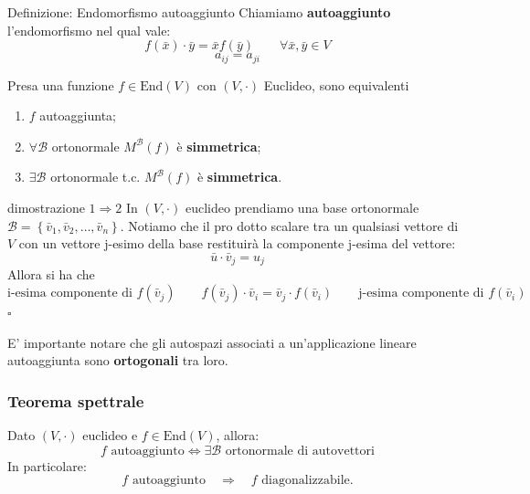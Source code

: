 \documentclass[x11names]{article}
\newcommand*{\QEDB}{\null\nobreak\hfill\ensuremath{\square}}%
\begin{document}
\begin{center}
\colorbox{myblue}{\begin{minipage}{5.75in}
\begin{blues}{Definizione: Endomorfismo autoaggiunto}
Chiamiamo \textbf{autoaggiunto} l'endomorfismo  nel qual vale:\[
f\left(\bar{x}\right)\cdot \bar{y} = \bar{x}f\left(\bar{y}\right) \qquad \forall\bar{x},\bar{y} \in V
\] 
\[
a_{ij} = a_{ji}
\]
\end{blues}
\end{minipage}}        
\end{center}

\noindent
Presa una funzione $f \in \text{End}(V)$ con $\left(V,\cdot\right)$ Euclideo, sono equivalenti
\begin{enumerate}
	\item $f$ autoaggiunta;
	\item $\forall \mathcal{B}$ ortonormale $M^\mathcal{B}(f)$ è \textbf{simmetrica};
	\item $\exists \mathcal{B}$ ortonormale t.c. $M^\mathcal{B}(f)$ è \textbf{simmetrica}.
\end{enumerate}

\begin{es}{dimostrazione $1 \Longrightarrow 2$}
	In $(V,\cdot)$ euclideo prendiamo una base ortonormale $\mathcal{B} = \left\{\bar{v}_{1},\bar{v}_{2},\dots,\bar{v}_{n}\right\}$. Notiamo che il pro dotto scalare tra un qualsiasi vettore di $V$ con un vettore j-esimo della base restituirà la componente j-esima del vettore:
	\[
	\bar{u} \cdot \bar{v}_{j} = u_{j}
	\]
	Allora si ha che
	\[
	\text{i-esima componente di } f(\bar{v}_{j}) \qquad f(\bar{v}_{j}) \cdot \bar{v}_{i} = \bar{v}_{j} \cdot f(\bar{v}_{i}) \qquad \text{j-esima componente di } f(\bar{v}_{i})
	\] \QEDB
\end{es}

\noindent
E' importante notare che gli autospazi associati a un'applicazione lineare autoaggiunta sono \textbf{ortogonali} tra loro.

\begin{center}
	\colorbox{myred}{\begin{minipage}{5.75in}
			\begin{redes}{}
				
			\subsubsection{Teorema spettrale}
			Dato $\left(V,\cdot\right)$ euclideo e $f \in \text{End}\left(V\right)$, allora: 
			\[
			f \text{ autoaggiunto} \Longleftrightarrow \exists \mathcal{B} \text{ ortonormale di autovettori}
			\]
			In particolare:
			\[
			f \text{ autoaggiunto}  \quad \Rightarrow \quad f \text{ diagonalizzabile}
			.\] 	
			\end{redes}
	\end{minipage}}        
\end{center}
\end{document}
